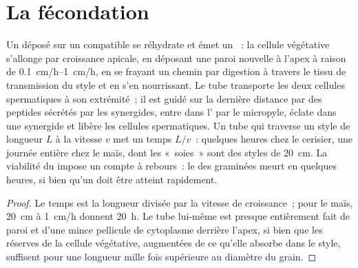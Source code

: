 \section{La fécondation}

\begin{theorem}\label{thm:b2:angiosperm-reproduction:tube}
Un  déposé sur un  compatible se réhydrate et
émet un \emph{}~: la cellule végétative s'allonge par
croissance apicale, en déposant une paroi nouvelle à l'apex à raison de
\qtyrange{0.1}{1}{cm/h}, en se frayant un chemin par digestion à
travers le tissu de transmission du style et en s'en nourrissant. Le
tube transporte les deux cellules spermatiques à son extrémité~; il est
guidé sur la dernière distance par des peptides sécrétés par les
synergides, entre dans l' par le micropyle, éclate dans une
synergide et libère les cellules spermatiques. Un tube qui traverse un
style de longueur $L$ à la vitesse $v$ met un temps $L/v$~: quelques
heures chez le cerisier, une journée entière chez le maïs, dont les
«~soies~» sont des styles de \qty{20}{cm}. La viabilité du 
impose un compte à rebours~: le  des graminées meurt en quelques
heures, si bien qu'un  doit être atteint rapidement.
\end{theorem}
\begin{proof}
Le temps est la longueur divisée par la vitesse de croissance~; pour le
maïs, \qty{20}{cm} à \qty{1}{cm/h} donnent \qty{20}{h}. Le tube
lui-même est presque entièrement fait de paroi et d'une mince pellicule
de cytoplasme derrière l'apex, si bien que les réserves de la cellule
végétative, augmentées de ce qu'elle absorbe dans le style, suffisent
pour une longueur mille fois supérieure au diamètre du grain.
\end{proof}

